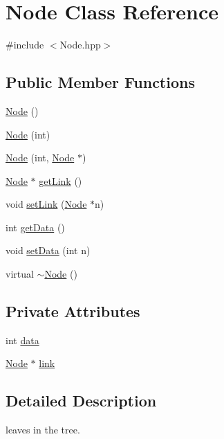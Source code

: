 \hypertarget{classNode}{\section{\-Node \-Class \-Reference}
\label{classNode}
}


{\ttfamily \#include $<$\-Node.\-hpp$>$}

\subsection*{\-Public \-Member \-Functions}
\begin{DoxyCompactItemize}
\item 
\hyperlink{classNode_ad7a34779cad45d997bfd6d3d8043c75f}{\-Node} ()
\item 
\hyperlink{classNode_aff71d952af8363f046a67a8b12194e46}{\-Node} (int)
\item 
\hyperlink{classNode_aff31c12e14a6f00952a46ff967db0c96}{\-Node} (int, \hyperlink{classNode}{\-Node} $\ast$)
\item 
\hyperlink{classNode}{\-Node} $\ast$ \hyperlink{classNode_ae58c0861ee385282a58a89c9bb77ebda}{get\-Link} ()
\item 
void \hyperlink{classNode_aa74be2f980782b6a45cdd589dc86108c}{set\-Link} (\hyperlink{classNode}{\-Node} $\ast$n)
\item 
int \hyperlink{classNode_aca98907146d5d0687f48bf8be9df9b7d}{get\-Data} ()
\item 
void \hyperlink{classNode_af687dd1011667e99a760c55cb22532e5}{set\-Data} (int n)
\item 
virtual \hyperlink{classNode_aa0840c3cb5c7159be6d992adecd2097c}{$\sim$\-Node} ()
\end{DoxyCompactItemize}
\subsection*{\-Private \-Attributes}
\begin{DoxyCompactItemize}
\item 
int \hyperlink{classNode_a87c003c9f600e3fc58e6e90835f0b605}{data}
\item 
\hyperlink{classNode}{\-Node} $\ast$ \hyperlink{classNode_a44bb6f65459bbec0064fad001706d242}{link}
\end{DoxyCompactItemize}


\subsection{\-Detailed \-Description}
leaves in the tree.

